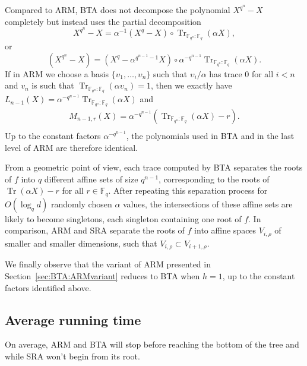 \documentclass{sig-alternate}
\newcommand{\ff}[1]{\mathbb{F}_{#1}}
\newcommand{\fq}{\ff{q}}
\newcommand{\dd}{d}
\newcommand{\qq}{q}
\newcommand{\nn}{n}
\newcommand{\qn}{{\qq^\nn}}
\newcommand{\basef}{\ff{\qq}}
\newcommand{\extf}{\ff{\qn}}
\DeclareMathOperator{\Tr}{Tr}
\newcommand{\trabs}[2]{\Tr_{#1:#2}}
\newcommand{\trextbase}{\trabs{\extf}{\basef}}
\begin{document}
Compared to ARM, BTA does not decompose the polynomial $X^{\qq^\nn}-X$ completely but instead uses the partial decomposition
\begin{equation*}
X^{\qq^\nn}-X=\alpha^{-1}(X^\qq- X)\circ\trextbase(\alpha X),  
\end{equation*}
or
\begin{equation*}
  (X^{q^n}-X) = (X^q- \alpha^{q^{n-1}-1} X)  \circ \alpha^{-q^{n-1}}\trextbase(\alpha X).  
\end{equation*}
If in ARM we choose a basis $\{\upsilon_1,\ldots,\upsilon_{\nn}\}$
such that $\upsilon_i/\alpha$ has trace 0 for all $i<\nn$ and $v_n$ is such that $\trextbase(\alpha \upsilon_n)=1$, then we exactly have
$L_{\nn-1}(X)=\alpha^{-q^{n-1}}\trextbase(\alpha X)$ and
\begin{multline*}
  M_{\nn-1,r}(X)=  \alpha^{-\qq^{\nn-1}}\left(\trextbase(\alpha X)-r\right). \\
\end{multline*}
Up to the constant factors $\alpha^{-q^{n-1}}$, the polynomials used
in BTA and in the last level of ARM are therefore identical.

From a geometric point of view, each trace computed by BTA separates the roots of $f$ into $q$ different affine sets of size $\qq^{\nn-1}$, corresponding to the roots of $\Tr(\alpha X)-r$ for all $r\in\fq$. After repeating this separation process for $O(\log_\qq\dd)$  randomly chosen $\alpha$ values, the intersections of these affine sets are likely to become singletons, each singleton containing one root of $f$. 
%
In comparison, ARM and SRA separate the roots of $f$ into affine spaces $V_{i,\rho}$ of smaller and smaller dimensions, such that $V_{i,\rho}\subset V_{i+1,\rho}$. 

We finally observe that the variant of ARM presented in Section~\ref{sec:BTA:ARMvariant} reduces to BTA when $h=1$, up to the constant factors identified above.


\subsection{Average running time}
\label{sec:avg}

On average, ARM and BTA will stop before reaching the bottom of the tree and while SRA won't begin from its root.

\medskip
\end{document}
